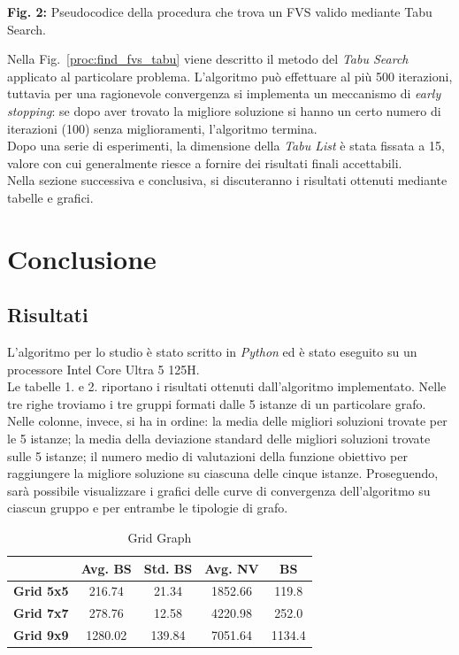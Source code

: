 \documentclass[a4paper, 10pt]{article}
\begin{document}
\begin{center}
\textbf{Fig. 2:} Pseudocodice della procedura che trova un FVS valido mediante Tabu Search.
\end{center}

\noindent
Nella Fig.~\ref{proc:find_fvs_tabu} viene descritto il metodo del \textit{Tabu Search} applicato al particolare problema. L'algoritmo può effettuare al più 500 iterazioni, tuttavia per una ragionevole convergenza si implementa un meccanismo di \textit{early stopping}: se dopo aver trovato la migliore soluzione si hanno un certo numero di iterazioni (100) senza miglioramenti, l'algoritmo termina. \\
Dopo una serie di esperimenti, la dimensione della \textit{Tabu List} è stata fissata a 15, valore con cui generalmente riesce a fornire dei risultati finali accettabili. \\
Nella sezione successiva e conclusiva, si discuteranno i risultati ottenuti mediante tabelle e grafici. 

\section{Conclusione}\label{s:4}
\subsection{Risultati}
L'algoritmo per lo studio è stato scritto in \textit{Python} ed è stato eseguito su un processore Intel Core Ultra 5 125H.\\
Le tabelle 1. e 2. riportano i risultati ottenuti dall'algoritmo implementato. Nelle tre righe troviamo i tre gruppi formati dalle 5 istanze di un particolare grafo. Nelle colonne, invece, si ha in ordine: la media delle migliori soluzioni trovate per le 5 istanze; la media della deviazione standard delle migliori soluzioni trovate sulle 5 istanze; il numero medio di valutazioni della funzione obiettivo per raggiungere la migliore soluzione su ciascuna delle cinque istanze. Proseguendo, sarà possibile visualizzare i grafici delle curve di convergenza dell'algoritmo su ciascun gruppo e per entrambe le tipologie di grafo.

\begin{table}[H]
\centering
\label{tab:grid_graph}
\begin{tabular}{|c|c|c|c|c|} %
\hline
 & \textbf{Avg. BS} & \textbf{Std. BS} & \textbf{Avg. NV} & \textbf{BS} \\ \hline
\textbf{Grid 5x5} & 216.74 & 21.34 & 1852.66 & 119.8\\ \hline
\textbf{Grid 7x7} & 278.76 & 12.58 & 4220.98 & 252.0\\ \hline
\textbf{Grid 9x9} & 1280.02 & 139.84 & 7051.64 & 1134.4 \\ \hline
\end{tabular}
\caption{Grid Graph} 
\end{table}
\end{document}

